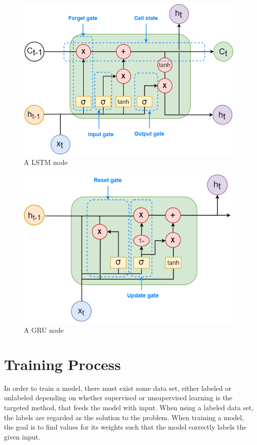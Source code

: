 \documentclass[nofilelist]{cslthse-msc}
\begin{document}

\begin{figure}[!ht]
    \centering
    \includegraphics[scale=0.58]{msccls/explanatory_images/lstm.png}
    \caption{A LSTM node} 
    \label{fig:lstm_node}
\end{figure}

\begin{figure}[!ht]
    \centering
    \includegraphics[scale=0.58]{msccls/explanatory_images/gru.png}
    \caption{A GRU node}
    \label{fig:gru_node}
\end{figure}


\section{Training Process}
In order to train a model, there must exist some data set, either labeled or unlabeled depending on whether supervised or unsupervised learning is the targeted method, that feeds the model with input. When using a labeled data set, the labels are regarded as the solution to the problem. When training a model, the goal is to find values for its weights such that the model correctly labels the given input. 
\end{document}
